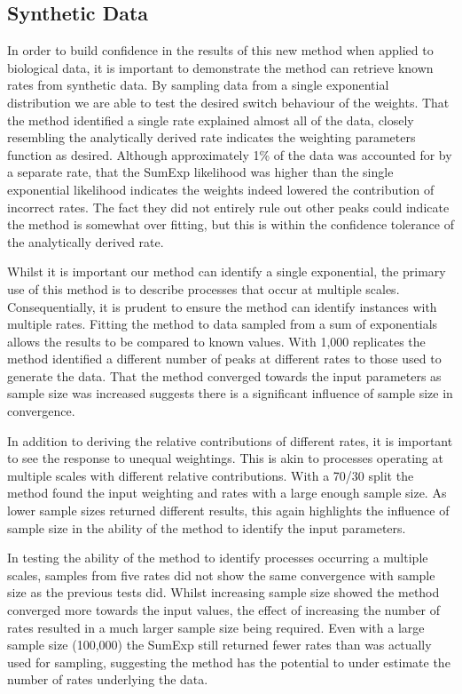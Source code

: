 \documentclass[11pt,usenames,dvipsnames]{article}
\begin{document}
\subsection{Synthetic Data}
In order to build confidence in the results of this new method when applied to biological data, it is important to demonstrate the method can retrieve known rates from synthetic data. By sampling data from a single exponential distribution we are able to test the desired switch behaviour of the weights. That the method identified a single rate explained almost all of the data, closely resembling the analytically derived rate indicates the weighting parameters function as desired. Although approximately 1\% of the data was accounted for by a separate rate, that the SumExp likelihood was higher than the single exponential likelihood indicates the weights indeed lowered the contribution of incorrect rates. The fact they did not entirely rule out other peaks could indicate the method is somewhat over fitting, but this is within the confidence tolerance of the analytically derived rate.

Whilst it is important our method can identify a single exponential, the primary use of this method is to describe processes that occur at multiple scales. Consequentially, it is prudent to ensure the method can identify instances with multiple rates. Fitting the method to data sampled from a sum of exponentials allows the results to be compared to known values. With 1,000 replicates the method identified a different number of peaks at different rates to those used to generate the data. That the method converged towards the input parameters as sample size was increased suggests there is a significant influence of sample size in convergence.

In addition to deriving the relative contributions of different rates, it is important to see the response to unequal weightings. This is akin to processes operating at multiple scales with different relative contributions. With a 70/30 split the method found the input weighting and rates with a large enough sample size. As lower sample sizes returned different results, this again highlights the influence of sample size in the ability of the method to identify the input parameters.

In testing the ability of the method to identify processes occurring a multiple scales, samples from five rates did not show the same convergence with sample size as the previous tests did. Whilst increasing sample size showed the method converged more towards the input values, the effect of increasing the number of rates resulted in a much larger sample size being required. Even with a large sample size (100,000) the SumExp still returned fewer rates than was actually used for sampling, suggesting the method has the potential to under estimate the number of rates underlying the data. 
\end{document}
